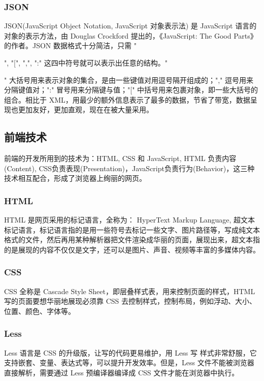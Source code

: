 \documentclass[UTF8]{ctexbook}
\begin{document}
            \subsubsection{JSON}
              \label{subsubsec:JSON}
                JSON(JavaScript Object Notation, JavaScript 对象表示法) 是 JavaScript 语言的对象的表示方法，由 Douglas Crockford 提出的，《JavaScript: The Good Parts》的作者。JSON 数据格式十分简洁，只需 "{", "[", ",", ":" 这四中符号就可以表示出任意的结构。"{" 大括号用来表示对象的集合，是由一些键值对用逗号隔开组成的；"," 逗号用来分隔键值对；":" 冒号用来分隔键与值；"[" 中括号用来包裹对象，即一些大括号的组合。相比于 XML，用最少的额外信息表示了最多的数据，节省了带宽，数据呈现也更加友好，更加直观，现在在被大量采用。

        \subsection{前端技术}
          \label{subsec:前端技术}
            前端的开发所用到的技术为：HTML, CSS 和 JavaScript, HTML 负责内容(Content), CSS负责表现(Presentation)，JavaScript负责行为(Behavior)，这三种技术相互配合，形成了浏览器上绚丽的网页。

            \subsubsection{HTML}
              \label{subsubsec:html}
                HTML 是网页采用的标记语言，全称为： HyperText Markup Language, 超文本标记语言，标记语言指的是用一些符号去标记一些文字、图片路径等，写成纯文本格式的文件，然后再用某种解析器把文件渲染成华丽的页面，展现出来，超文本指的是展现的内容不仅仅是文字，还可以是图片、声音、视频等丰富的多媒体内容。

            \subsubsection{CSS}
              \label{subsubsec:css}
                CSS 全称是 Cascade Style Sheet，即层叠样式表，用来控制页面的样式，HTML 写的页面要想华丽地展现必须靠 CSS 去控制样式，控制布局，例如浮动、大小、位置、颜色、字体等。

            \subsubsection{Less}
              \label{subsubsec:less}
                Less 语言是 CSS 的升级版，让写的代码更易维护，用 Less 写 样式非常舒服，它支持嵌套、变量、表达式等，可以提升开发效率。但是，Less 文件不能被浏览器直接解析，需要通过 Less 预编译器编译成 CSS 文件才能在浏览器中执行。

}}
\end{document}
